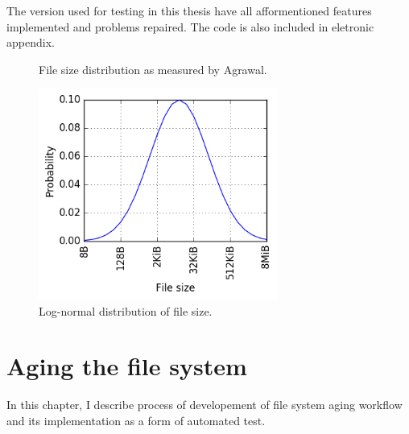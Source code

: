 \documentclass[
  color, %
  table, %
  lof,   %
  lot,   %
]{fithesis3}
\begin{document}
The version used for testing in this thesis have all afformentioned features implemented and problems repaired. The code is also included in eletronic appendix.

\begin{figure}
    \centering
    \caption{File size distribution as measured by Agrawal.~\cite{agrawal2007five}}
    \label{fig:filedist}
\end{figure}

\begin{figure}%
    \begin{minipage}{\textwidth}
        \centering
        \includegraphics[width=0.7\textwidth]{../scripts/dist3.png}
        \caption{Log-normal distribution of file size.}
\label{fig:lognormal}
    \end{minipage}
\end{figure}



\chapter{Aging the file system}
\label{aging}
In this chapter, I describe process of developement of file system aging workflow and its implementation as a form of automated test.
\end{document}
